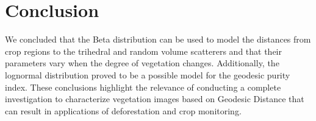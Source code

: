 \documentclass[12pt]{article}
\begin{document}
\section{Conclusion}
We concluded that the Beta distribution can be used to model the distances from crop regions to the trihedral and random volume scatterers and that their parameters vary when the degree of vegetation changes. Additionally, the lognormal distribution proved to be a possible model for the geodesic purity index. These conclusions highlight the relevance of conducting a complete investigation to characterize vegetation images based on Geodesic Distance that can result in applications of deforestation and crop monitoring.
\end{document}
